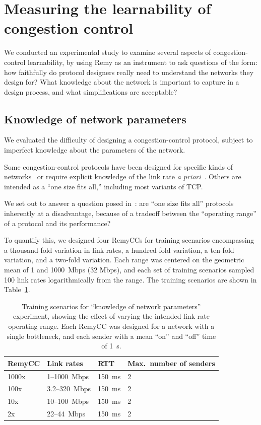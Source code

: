 \section{Measuring the learnability of congestion control}
\label{s:operational}

We conducted an experimental study to examine several aspects of
congestion-control learnability, by using Remy as an instrument to ask
questions of the form: how faithfully do protocol designers really
need to understand the networks they design for? What knowledge about
the network is important to capture in a design process, and what
simplifications are acceptable?

\subsection{Knowledge of network parameters}

\label{s:oprangeperftradeoff}

We evaluated the difficulty of designing a congestion-control
protocol, subject to imperfect knowledge about the parameters of the
network.

Some congestion-control protocols have been designed for specific
kinds of networks~\cite{dctcp,westwood} or require explicit knowledge
of the link rate \emph{a priori}~\cite{xcp}. Others are intended as a
``one size fits all,'' including most variants of TCP.

We set out to answer a question posed in~\cite{wroclawski}: are ``one
size fits all'' protocols inherently at a disadvantage, because of a
tradeoff between the ``operating range'' of a protocol and its performance?

To quantify this, we designed four RemyCCs for training
scenarios encompassing a thousand-fold variation in link rates, a
hundred-fold variation, a ten-fold variation, and a two-fold
variation. Each range was centered on the geometric mean of 1 and
1000~Mbps (32 Mbps), and each set of training scenarios sampled 100
link rates logarithmically from the range. The training scenarios are
shown in Table~\ref{table:oprange}.

\begin{table}
\caption{Training scenarios for ``knowledge of network parameters''
  experiment, showing the effect of varying the intended link rate
  operating range. Each RemyCC was designed for a network with a single
  bottleneck, and each sender with a mean ``on'' and ``off'' time of
  1~s.}
\label{table:oprange}
\begin{center}
\begin{tabular}{l|l|l|l}
\bf RemyCC & \bf Link rates & \bf RTT & \bf Max.~number of senders \\
\hline
1000x  & 1--1000~Mbps & 150~ms & 2 \\
100x   & 3.2--320~Mbps & 150~ms & 2 \\
10x    & 10--100~Mbps & 150~ms & 2 \\
2x     & 22--44~Mbps & 150~ms & 2 \\
\end{tabular}
\end{center}
\end{table}

